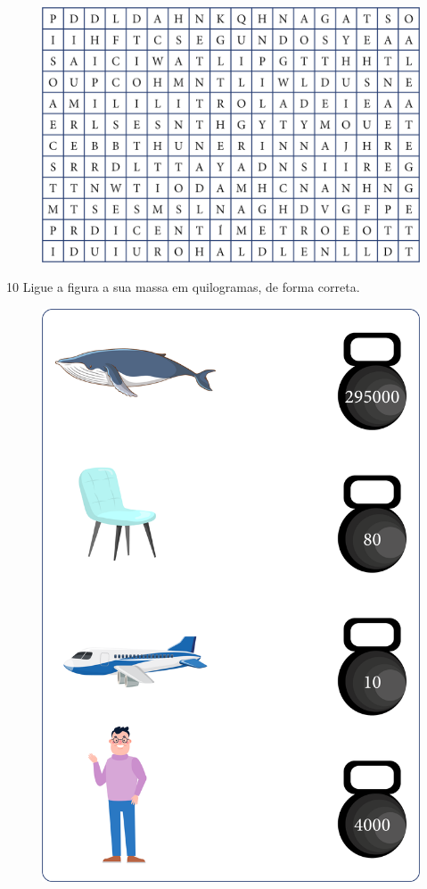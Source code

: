 \begin{figure}[htpb!]
\includegraphics[width=\textwidth]{./media/image40.png}
\end{figure}


\pagebreak
\num{10} Ligue a figura a sua massa em quilogramas, de forma correta.

\begin{figure}[htpb!]
\centering
\includegraphics[width=.85\textwidth]{./media/image41.png}
\end{figure}


